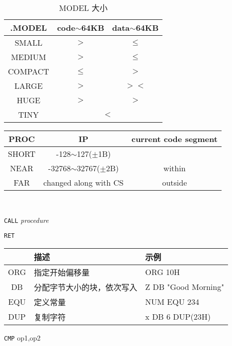 \begin{table}[H]
	\centering
	\caption{MODEL 大小}
	\begin{tabular}{|>{\ttfamily}c|c|c|}
		\hline
		.MODEL & code$\sim$64KB & data$\sim$64KB \\
		\hline
		SMALL & $>$& $\leq$ \\
		MEDIUM & $>$ & $\leq$ \\
		COMPACT & $\leq$ & $>$\\
		LARGE &$>$ &$><$ \\
		HUGE &$>$ &$>$ \\
		TINY &\multicolumn{2}{c|}{$<$} \\
		\hline
	\end{tabular}
\end{table}

\begin{table*}
	\begin{minipage}{0.6\textwidth}
		\centering
		\caption{PROC 范围}
		\begin{tabular}{|>{\ttfamily}c|c|c|}
			\hline
			PROC & IP & current code segment \\
			\hline
			SHORT & -128$\sim$127($\pm$1B) &  \\
			\hline
			NEAR & -32768$\sim$32767($\pm$2B) & within \\
			\hline
			FAR & changed along with CS & outside \\
			\hline
		\end{tabular}\\
		\raggedright
		\texttt{CALL} \textit{procedure}\\
		\raggedright\texttt{RET}\\
		\centering
		\caption{数据定义}
		\begin{tabular}{|>{\ttfamily}c|l|>{\ttfamily}l|}
			\hline
			&\bfseries 描述 &\bfseries 示例 \\
			\hline
			ORG & 指定开始偏移量 & ORG 10H \\
			\hline
			DB & 分配字节大小的块，依次写入 & Z DB "Good Morning" \\
			\hline
			EQU & 定义常量 & NUM EQU 234 \\
			\hline
			DUP & 复制字符 & x DB 6 DUP(23H) \\
			\hline
		\end{tabular}
	\end{minipage}
	\begin{minipage}{0.4\textwidth}
		\raggedright
		\texttt{CMP} op1,op2\\
		\centering
		\caption{跳转指令}

\end{minipage}
\end{table*}
